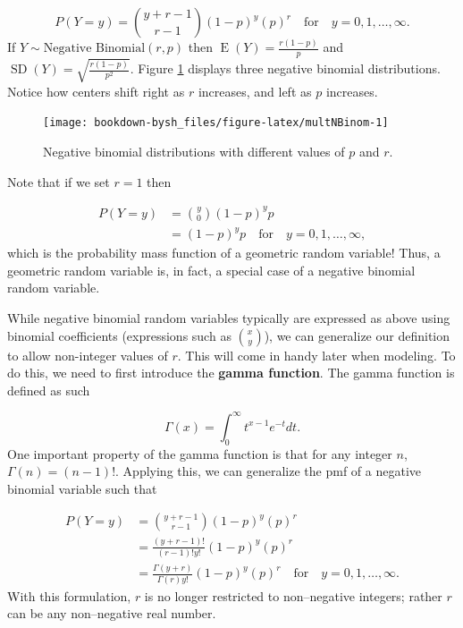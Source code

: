 \documentclass[
]{krantz}
\newcommand{\E}{\operatorname{E}}
\newcommand{\SD}{\operatorname{SD}}
\begin{document}
\begin{equation}
P(Y=y) = \binom{y + r - 1}{r-1} (1-p)^{y}(p)^r \quad \textrm{for}\quad y = 0, 1, \ldots, \infty.
\label{eq:nBinomRV}
\end{equation}
If \(Y \sim \textrm{Negative Binomial}(r, p)\) then \(\E(Y) = \frac{r(1-p)}{p}\) and \(\SD(Y) = \sqrt{\frac{r(1-p)}{p^2}}\). Figure \ref{fig:multNBinom} displays three negative binomial distributions. Notice how centers shift right as \(r\) increases, and left as \(p\) increases.



\begin{figure}

{\centering \texttt{[image: bookdown-bysh\_files/figure-latex/multNBinom-1]} 

}

\caption{Negative binomial distributions with different values of \(p\) and \(r\).}\label{fig:multNBinom}
\end{figure}

Note that if we set \(r=1\) then

\begin{align*}
 P(Y=y) &= \binom{y}{0} (1-p)^yp \\
        &= (1-p)^yp \quad \textrm{for} \quad y = 0, 1, \ldots, \infty,
\end{align*}
which is the probability mass function of a geometric random variable! Thus, a geometric random variable is, in fact, a special case of a negative binomial random variable.

While negative binomial random variables typically are expressed as above using binomial coefficients (expressions such as \(\binom{x}{y}\)), we can generalize our definition to allow non-integer values of \(r\). This will come in handy later when modeling. To do this, we need to first introduce the \textbf{gamma function}.  The gamma function is defined as such

\begin{equation}
\Gamma(x)  = \int_0^\infty t^{x-1} e^{-t}dt.
\label{eq:gammaFun}
\end{equation}
One important property of the gamma function is that for any integer \(n\), \(\Gamma(n) = (n-1)!\). Applying this, we can generalize the pmf of a negative binomial variable such that

\begin{align*}
 P(Y=y) &= \binom{y + r - 1}{r-1}           (1-p)^{y}(p)^r \\
        &= \frac{(y+r-1)!}{(r-1)!y!}         (1-p)^{y}(p)^r \\
        &= \frac{\Gamma(y+r)}{\Gamma(r) y!}  (1-p)^{y}(p)^r \quad \textrm{for} \quad y = 0, 1, \ldots, \infty.
\end{align*}
With this formulation, \(r\) is no longer restricted to non--negative integers; rather \(r\) can be any non--negative real number.
\end{document}
